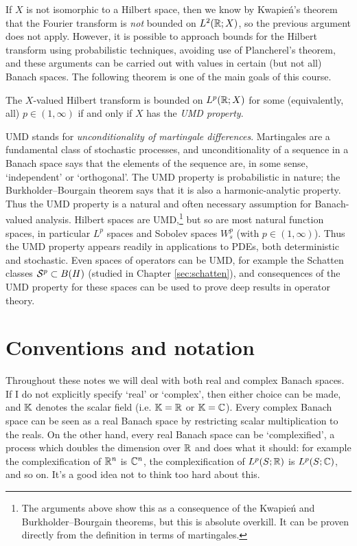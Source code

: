 If $X$ is not isomorphic to a Hilbert space, then we know by Kwapie\'n's theorem that the Fourier transform is \emph{not} bounded on $L^2(\mathbb{R};X)$, so the previous argument does not apply.
However, it is possible to approach bounds for the Hilbert transform using probabilistic techniques, avoiding use of Plancherel's theorem, and these arguments can be carried out with values in certain (but not all) Banach spaces.
The following theorem is one of the main goals of this course.

\begin{thm}
  The $X$-valued Hilbert transform is bounded on $L^p(\mathbb{R};X)$ for some (equivalently, all) $p \in (1,\infty)$ if and only if $X$ has the \emph{UMD property}.
\end{thm}

UMD stands for \emph{unconditionality of martingale differences}.
Martingales are a fundamental class of stochastic processes, and unconditionality of a sequence in a Banach space says that the elements of the sequence are, in some sense, `independent' or `orthogonal'.
The UMD property is probabilistic in nature; the Burkholder--Bourgain theorem says that it is also a harmonic-analytic property.
Thus the UMD property is a natural and often necessary assumption for Banach-valued analysis.
Hilbert spaces are UMD,\footnote{The arguments above show this as a consequence of the Kwapie\'n and Burkholder--Bourgain theorems, but this is absolute overkill. It can be proven directly from the definition in terms of martingales.} but so are most natural function spaces, in particular $L^p$ spaces and Sobolev spaces $W^{p}_{s}$ (with $p \in (1,\infty)$).
Thus the UMD property appears readily in applications to PDEs, both deterministic and stochastic.
Even spaces of operators can be UMD, for example the Schatten classes $\mathcal{S}^{p} \subset B(H)$ (studied in Chapter \ref{sec:schatten}), and consequences of the UMD property for these spaces can be used to prove deep results in operator theory.


\section{Conventions and notation}\label{sec:conventions}
Throughout these notes we will deal with both real and complex Banach spaces.
If I do not explicitly specify `real' or `complex', then either choice can be made, and $\mathbb{K}$ denotes the scalar field (i.e. $\mathbb{K} = \mathbb{R}$ or $\mathbb{K} = \mathbb{C}$).
Every complex Banach space can be seen as a real Banach space by restricting scalar multiplication to the reals.
On the other hand, every real Banach space can be `complexified', a process which doubles the dimension over $\mathbb{R}$ and does what it should: for example the complexification of $\mathbb{R}^n$ is $\mathbb{C}^n$, the complexification of $L^p(S;\mathbb{R})$ is $L^p(S;\mathbb{C})$, and so on.
It's a good idea not to think too hard about this.

